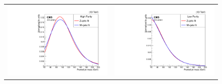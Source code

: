 \begin{figure}[!ht]
\begin{tabular}{cc}
  \includegraphics[width=220pt]{figuresARC/Vjets/VjetsHP.pdf} &
\includegraphics[width=220pt]{figuresARC/Vjets/VjetsLP.pdf}\\
\end{tabular}
\label{fig:Vjets}
\end{figure}

